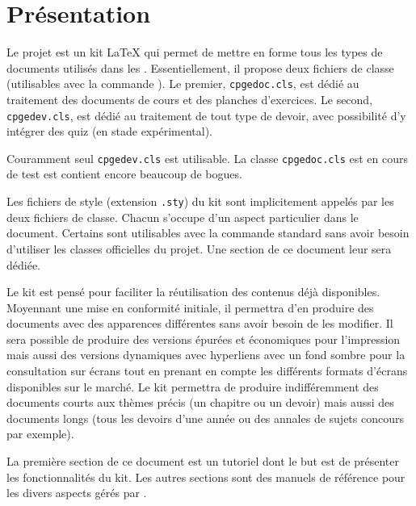 \documentclass[11pt,report,oneside,solution]{cpgedev}
\let\CMD\cmd
\renewcommand\cmd[1]{{\spotcolor\CMD{#1}}}
\begin{document}


\section{Présentation} 
Le projet  est un kit \LaTeX{} qui permet de mettre en forme tous les types de documents utilisés dans les . Essentiellement, il propose deux fichiers de classe (utilisables avec la commande ). Le premier, \verb+cpgedoc.cls+, est dédié au traitement des documents de cours et des planches d'exercices. Le second, \verb+cpgedev.cls+, est dédié au traitement de tout type de devoir, avec possibilité d'y intégrer des quiz (en stade expérimental).

\begin{nb} Couramment seul \verb+cpgedev.cls+ est utilisable. La classe \verb+cpgedoc.cls+ est en cours de test est contient encore beaucoup de bogues.
\end{nb} 

Les fichiers de style (extension \texttt{.sty}) du kit sont implicitement appelés par les deux fichiers de classe. Chacun s'occupe d'un aspect particulier dans le document. Certains sont utilisables avec la commande standard  sans avoir besoin d'utiliser les classes officielles du projet. Une section de ce document leur sera dédiée. 

Le kit est pensé pour faciliter la réutilisation des contenus déjà disponibles. Moyennant une mise en conformité initiale, il permettra d'en produire des documents avec des apparences différentes sans avoir besoin de les modifier. Il sera possible de produire des versions épurées et économiques pour l'impression mais aussi des versions dynamiques avec hyperliens avec un fond sombre pour la consultation sur écrans tout en prenant en compte les différents formats d'écrans disponibles sur le marché. Le kit permettra de produire indifféremment des documents courts aux thèmes précis (un chapitre ou un devoir) mais aussi des documents longs (tous les devoirs d'une année ou des annales de sujets concours par exemple). 

La première section de ce document est un tutoriel dont le but est de présenter les fonctionnalités du kit. Les autres sections sont des manuels de référence pour les divers aspects gérés par .  
\end{document}
